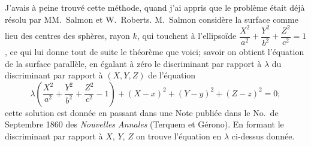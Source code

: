 \documentclass[11pt,a4paper]{book}
\begin{document}
J'avais \`{a} peine trouv\'{e} cette m\'{e}thode, quand j'ai appris que le probl\`{e}me \'{e}tait d\'{e}j\`{a} r\'{e}solu par MM.~Salmon et W.~Roberts. M.~Salmon consid\`{e}re la surface comme lieu des centres des sph\`{e}res, rayon $k$, qui touchent \`{a} l'ellipso\"{i}de $\dfrac{X^2}{a^2} + \dfrac{Y^2}{b^2} + \dfrac{Z^2}{c^2} = 1$, ce qui lui donne tout de suite le th\'{e}or\`{e}me que voici; savoir on obtient l'\'{e}quation de la surface parall\`{e}le, en \'{e}galant \`{a} z\'{e}ro le discriminant par rapport \`{a} $\lambda$ du discriminant par rapport \`{a} $(X, Y, Z)$ de l'\'{e}quation
\[
\lambda\left(\frac{X^2}{a^2} + \frac{Y^2}{b^2} + \frac{Z^2}{c^2} - 1\right) + (X-x)^2 + (Y-y)^2 + (Z-z)^2 = 0;
\]
cette solution est donn\'{e}e en passant dans une Note publi\'{e}e dans le No.~de Septembre 1860 des \textit{Nouvelles Annales} (Terquem et G\'{e}rono). En formant le discriminant par rapport \`{a} $X$, $Y$, $Z$ on trouve l'\'{e}quation en $\lambda$ ci-dessus donn\'{e}e.
\end{document}
